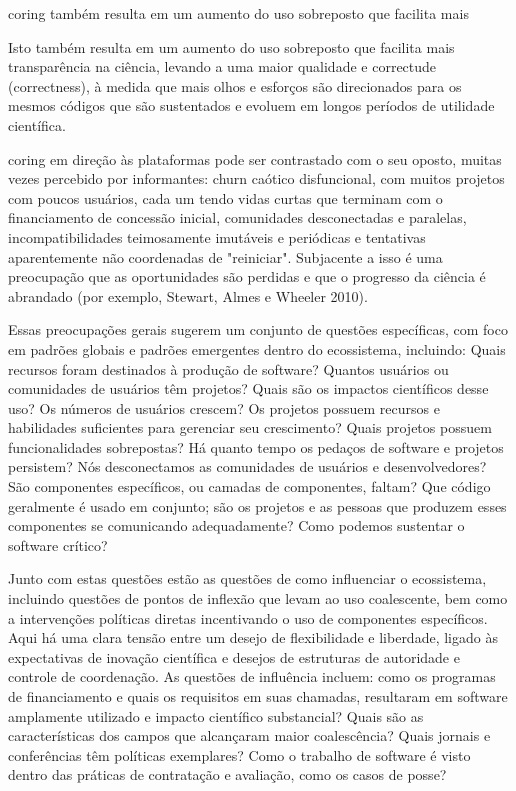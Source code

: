 coring também resulta em um aumento do uso sobreposto que facilita mais

Isto também resulta em um aumento do uso sobreposto que facilita mais
transparência na ciência, levando a uma maior qualidade e correctude (correctness), à medida
que mais olhos e esforços são direcionados para os mesmos códigos que são
sustentados e evoluem em longos períodos de utilidade científica.

coring em direção às plataformas pode ser contrastado com o seu oposto, muitas
vezes percebido por informantes: churn caótico disfuncional, com muitos
projetos com poucos usuários, cada um tendo vidas curtas que terminam com o
financiamento de concessão inicial, comunidades desconectadas e paralelas,
incompatibilidades teimosamente imutáveis e periódicas e tentativas
aparentemente não coordenadas de "reiniciar". Subjacente a isso é uma
preocupação que as oportunidades são perdidas e que o progresso da ciência é
abrandado (por exemplo, Stewart, Almes e Wheeler 2010).

Essas preocupações gerais sugerem um conjunto de questões específicas, com foco
em padrões globais e padrões emergentes dentro do ecossistema, incluindo: Quais
recursos foram destinados à produção de software? Quantos usuários ou
comunidades de usuários têm projetos? Quais são os impactos científicos desse
uso? Os números de usuários crescem? Os projetos possuem recursos e habilidades
suficientes para gerenciar seu crescimento? Quais projetos possuem
funcionalidades sobrepostas? Há quanto tempo os pedaços de software e projetos
persistem? Nós desconectamos as comunidades de usuários e desenvolvedores? São
componentes específicos, ou camadas de componentes, faltam? Que código
geralmente é usado em conjunto; são os projetos e as pessoas que produzem esses
componentes se comunicando adequadamente? Como podemos sustentar o software
crítico?

Junto com estas questões estão as questões de como influenciar o ecossistema,
incluindo questões de pontos de inflexão que levam ao uso coalescente, bem como
a intervenções políticas diretas incentivando o uso de componentes específicos.
Aqui há uma clara tensão entre um desejo de flexibilidade e liberdade, ligado
às expectativas de inovação científica e desejos de estruturas de autoridade e
controle de coordenação. As questões de influência incluem: como os programas
de financiamento e quais os requisitos em suas chamadas, resultaram em software
amplamente utilizado e impacto científico substancial? Quais são as
características dos campos que alcançaram maior coalescência? Quais jornais e
conferências têm políticas exemplares? Como o trabalho de software é visto
dentro das práticas de contratação e avaliação, como os casos de posse?

